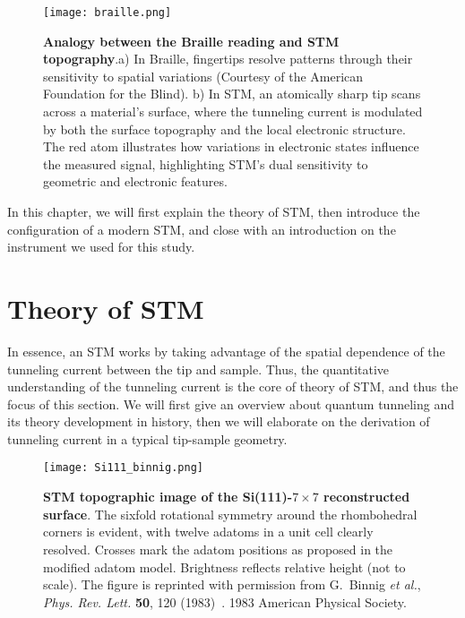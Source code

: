\begin{figure}
	\centering
	\texttt{[image: braille.png]}
	\caption[\textbf{Analogy between the Braille reading and STM topography}]{\textbf{Analogy between the Braille reading and STM topography}.a) In Braille, fingertips resolve patterns through their sensitivity to spatial variations (Courtesy of the American Foundation for the Blind). b) In STM, an atomically sharp tip scans across a material’s surface, where the tunneling current is modulated by both the surface topography and the local electronic structure. The red atom illustrates how variations in electronic states influence the measured signal, highlighting STM’s dual sensitivity to geometric and electronic features.}
	\label{fig:braille}
\end{figure}

In this chapter, we will first explain the theory of \ac{STM}, then introduce the configuration of a modern \ac{STM}, and close with an introduction on the instrument we used for this study. 


\section{Theory of STM}
In essence, an \ac{STM} works by taking advantage of the spatial dependence of the tunneling current between the tip and sample. Thus, the quantitative understanding of the tunneling current is the core of theory of \ac{STM}, and thus the focus of this section. We will first give an overview about quantum tunneling and its theory development in history, then we will elaborate on the derivation of tunneling current in a typical tip-sample geometry.

\begin{figure}
	\centering
	\texttt{[image: Si111\_binnig.png]}
	\caption[\textbf{STM topographic image of the Si(111)-$7 \times 7$ reconstructed surface}]{\textbf{STM topographic image of the Si(111)-$7 \times 7$ reconstructed surface}. The sixfold rotational symmetry around the rhombohedral corners is evident, with twelve adatoms in a unit cell clearly resolved. Crosses mark the adatom positions as proposed in the modified adatom model. Brightness reflects relative height (not to scale). The figure is reprinted with permission from G.~Binnig \textit{et al.}, \textit{Phys. Rev. Lett.} \textbf{50}, 120 (1983)~\cite{binnig77Reconstruction1983}. \textcopyright{} 1983 American Physical Society.}
	\label{figure:si111_binnig}
\end{figure}

